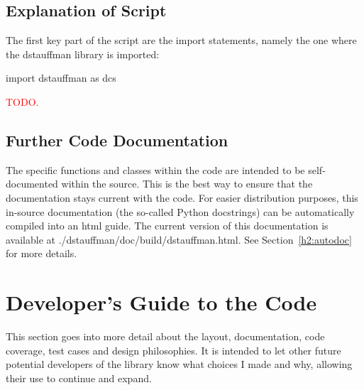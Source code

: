 \documentclass[12pt]{article}
\begin{document}
\subsection{Explanation of Script}\label{h2:Explanation_of_script}
The first key part of the script are the import statements, namely the one where the dstauffman library is imported:
\begin{Python}
    import dstauffman as dcs
\end{Python}

\textcolor{red}{TODO.}

\subsection{Further Code Documentation}\label{h2:Further_code_documentation}
The specific functions and classes within the code are intended to be self-documented within the source.  This is the best way to ensure that the documentation stays current with the code.  For easier distribution purposes, this in-source documentation (the so-called Python docstrings) can be automatically compiled into an html guide.  The current version of this documentation is available at ./dstauffman/doc/build/dstauffman.html.  See Section~\ref{h2:autodoc} for more details.

\pagebreak
\section{Developer's Guide to the Code}\label{h1:Developers_guide}
This section goes into more detail about the layout, documentation, code coverage, test cases and design philosophies.  It is intended to let other future potential developers of the library know what choices I made and why, allowing their use to continue and expand.
\end{document}
